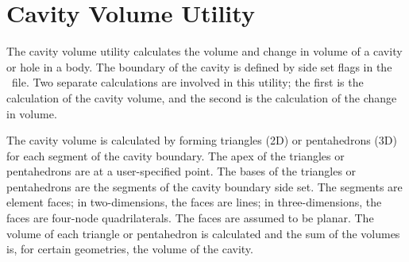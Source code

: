 \section{Cavity Volume Utility}\label{sec:cavity}
The cavity volume utility calculates the volume and change in volume of
a cavity or hole in a body.  The boundary of the cavity is defined by
side set flags in the \exo\ file.  Two separate calculations are
involved in this utility; the first is the calculation of the
cavity volume, and the second is the calculation of the change in
volume.

The cavity volume is calculated by forming triangles (2D) or
pentahedrons (3D) for each segment of the cavity boundary.  The apex of
the triangles or pentahedrons are at a user-specified point. The bases
of the triangles or pentahedrons are the segments of the cavity boundary
side set.  The segments are element faces; in two-dimensions, the faces
are lines; in three-dimensions, the faces are four-node quadrilaterals.
The faces are assumed to be planar.  The volume of each triangle or
pentahedron is calculated and the sum of the volumes is, for certain
geometries, the volume of the cavity.

